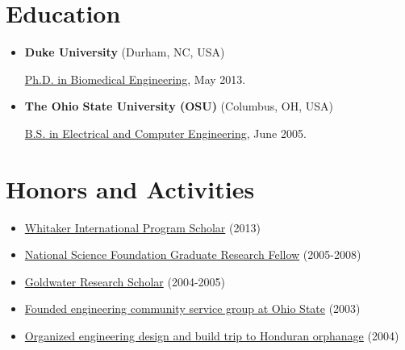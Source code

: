 \documentclass[letterpaper,10pt,english]{sphinxmanual}
\begin{document}
\section{Education}
\label{resume:education}\begin{itemize}
\item {} 
\textbf{Duke University} (Durham, NC, USA)

\href{http://bme.duke.edu/grad}{Ph.D. in Biomedical Engineering}, May
2013.

\item {} 
\textbf{The Ohio State University (OSU)} (Columbus, OH, USA)

\href{http://ece.osu.edu/futurestudents/undergrad}{B.S. in Electrical and Computer
Engineering}, June
2005.

\end{itemize}


\section{Honors and Activities}
\label{resume:honors-and-activities}\begin{itemize}
\item {} 
\href{http://www.whitaker.org/grants/fellows-scholars}{Whitaker International Program
Scholar} (2013)

\item {} 
\href{http://www.nsfgrfp.org/}{National Science Foundation Graduate Research
Fellow} (2005-2008)

\item {} 
\href{https://goldwater.scholarsapply.org/}{Goldwater Research Scholar}
(2004-2005)

\item {} 
\href{http://ecos.osu.edu/}{Founded engineering community service group at Ohio
State} (2003)

\item {} 
\href{http://www.montanadeluz.org/}{Organized engineering design and build trip to Honduran
orphanage} (2004)

\end{itemize}
\end{document}
